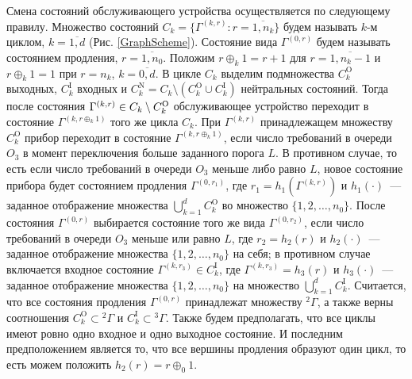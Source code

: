 \documentclass[a4paper,12pt,russian]{extarticle}
\begin{document}
Смена состояний обслуживающего устройства осуществляется по следующему правилу. Множество состояний $C_k = \{\Gamma^{(k,r)} \colon r=\overline{1,n_k}\}$ будем называть $k$-м циклом, $k=\overline{1,d}$ (Рис. \ref{GraphScheme}). Состояние вида $\Gamma^{(0,r)}$ будем называть состоянием продления, $r=\overline{1,n_0}$. Положим $r \oplus_k 1 = r+1$ для $r=\overline{1,n_k-1}$ и $r \oplus_k 1 = 1$ при $r=n_k$, $k = \overline{0,d}$. В цикле $C_k$ выделим подмножества $C_k^{\mathrm{O}}$ выходных, $C_k^{\mathrm{I}}$ входных и $C_k^{\mathrm{N}} = C_k \setminus (C_k^{\mathrm{O}} \cup C_k^{\mathrm{I}})$ нейтральных состояний. Тогда после состояния $\Gamma^{(k,r)} \hm\in C_k\setminus C_k^{\mathrm{O}}$ обслуживающее устройство переходит в состояние $\Gamma^{(k,r \oplus_k 1)}$ того же цикла $C_k$. При $\Gamma^{(k,r)}$ принадлежащем множеству $C_k^{\mathrm{O}}$ прибор переходит в состояние $\Gamma^{(k,r \oplus_k 1)}$, если число требований в очереди $O_3$ в момент переключения больше заданного порога $L$. В противном случае, то есть если число требований в очереди $O_3$ меньше либо равно $L$, новое состояние прибора будет состоянием продления $\Gamma^{(0,r_1)}$, где $r_1=h_1(\Gamma^{(k,r)})$ и $h_1(\cdot)$~--- заданное отображение множества $\bigcup\limits_{k=1}^d C_k^{\mathrm{O}}$ во множество $\{1,2,\ldots, n_0\}$. После состояния $\Gamma^{(0,r)}$ выбирается состояние того же вида $\Gamma^{(0,r_2)}$, если число требований в очереди $O_3$ меньше или равно $L$, где $r_2=h_2(r)$ и $h_2(\cdot)$~--- заданное отображение множества $\{1,2, \ldots, n_0\}$ на себя; в противном случае включается входное состояние $\Gamma^{(k,r_3)} \in C_k^{\mathrm{I}}$, где $\Gamma^{(k,r_3)}=h_3(r)$ и $h_3(\cdot)$~--- заданное отображение множества $\{1,2, \ldots, n_0\}$ на множество  $\bigcup\limits_{k=1}^d C_k^{\mathrm{I}}$. Считается, что все состояния продления $\Gamma^{(0,r)}$ принадлежат множеству ${}^2 \Gamma$, а также верны соотношения $C_k^\mathrm{O}\subset {}^2 \Gamma$ и $C_k^\mathrm{I}\subset {}^3 \Gamma$. Также будем предполагать, что все циклы имеют ровно одно входное и одно выходное состояние. И последним предположением является то, что все вершины продления образуют один цикл, то есть можем положить $h_2(r)=r\oplus_0 1$.
\end{document}
